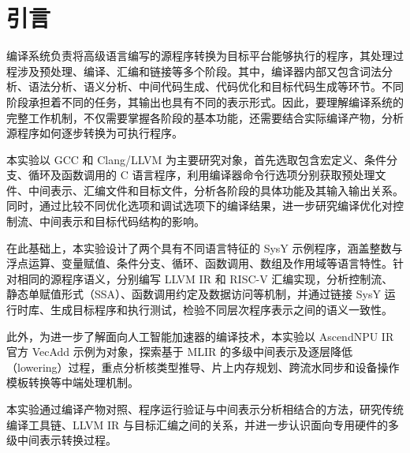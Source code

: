\section{引言}
\label{sec:method}
编译系统负责将高级语言编写的源程序转换为目标平台能够执行的程序，其处理过程涉及预处理、编译、汇编和链接等多个阶段。其中，编译器内部又包含词法分析、语法分析、语义分析、中间代码生成、代码优化和目标代码生成等环节。不同阶段承担着不同的任务，其输出也具有不同的表示形式。因此，要理解编译系统的完整工作机制，不仅需要掌握各阶段的基本功能，还需要结合实际编译产物，分析源程序如何逐步转换为可执行程序。

本实验以 GCC 和 Clang/LLVM 为主要研究对象，首先选取包含宏定义、条件分支、循环及函数调用的 C 语言程序，利用编译器命令行选项分别获取预处理文件、中间表示、汇编文件和目标文件，分析各阶段的具体功能及其输入输出关系。同时，通过比较不同优化选项和调试选项下的编译结果，进一步研究编译优化对控制流、中间表示和目标代码结构的影响。

在此基础上，本实验设计了两个具有不同语言特征的 SysY 示例程序，涵盖整数与浮点运算、变量赋值、条件分支、循环、函数调用、数组及作用域等语言特性。针对相同的源程序语义，分别编写 LLVM IR 和 RISC-V 汇编实现，分析控制流、静态单赋值形式（SSA）、函数调用约定及数据访问等机制，并通过链接 SysY 运行时库、生成目标程序和执行测试，检验不同层次程序表示之间的语义一致性。

此外，为进一步了解面向人工智能加速器的编译技术，本实验以 AscendNPU IR 官方 VecAdd 示例为对象，探索基于 MLIR 的多级中间表示及逐层降低（lowering）过程，重点分析核类型推导、片上内存规划、跨流水同步和设备操作模板转换等中端处理机制。

本实验通过编译产物对照、程序运行验证与中间表示分析相结合的方法，研究传统编译工具链、LLVM IR 与目标汇编之间的关系，并进一步认识面向专用硬件的多级中间表示转换过程。
